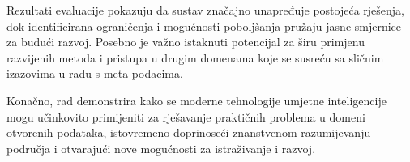 Rezultati evaluacije pokazuju da sustav značajno unapređuje postojeća rješenja, 
dok identificirana ograničenja i mogućnosti poboljšanja pružaju jasne smjernice 
za budući razvoj. Posebno je važno istaknuti potencijal za širu primjenu 
razvijenih metoda i pristupa u drugim domenama koje se susreću sa sličnim 
izazovima u radu s meta podacima.

Konačno, rad demonstrira kako se moderne tehnologije umjetne inteligencije mogu 
učinkovito primijeniti za rješavanje praktičnih problema u domeni otvorenih 
podataka, istovremeno doprinoseći znanstvenom razumijevanju područja i 
otvarajući nove mogućnosti za istraživanje i razvoj. 